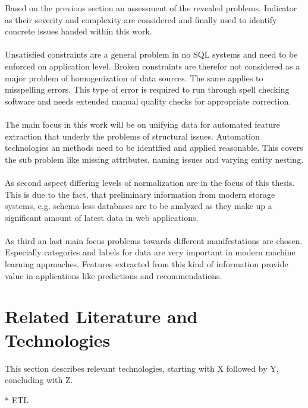 Based on the previous section an assessment of the revealed problems. Indicator as their severity and complexity are considered and finally used to identify concrete issues handed within this work. 
\\\\
Unsatisfied constraints are a general problem in no SQL systems and need to be enforced on application level. Broken constraints are therefor not considered as a major problem of homogenization of data sources. The same applies to misspelling errors. This type of error is required to run through spell checking software and needs extended manual quality checks for appropriate correction. 
\\\\
The main focus in this work will be on unifying data for automated feature extraction that underly the problems of structural issues. Automation technologies an methods need to be identified and applied reasonable. This covers the sub problem like missing attributes, naming issues and varying entity nesting.
\\\\
As second aspect differing levels of normalization are in the focus of this thesis. This is due to the fact, that preliminary information from modern storage systems, e.g. schema-less databases are to be analyzed as they make up a significant amount of latest data in web applications.
\\\\
As third an last main focus problems towards different manifestations are chosen. Especially categories and labels for data are very important in modern machine learning approaches. Features extracted from this kind of information provide value in applications like predictions and recommendations.

\section{Related Literature and Technologies \label{sec:tech}}


This section describes relevant technologies, starting with X followed by Y, concluding with Z.

* ETL
